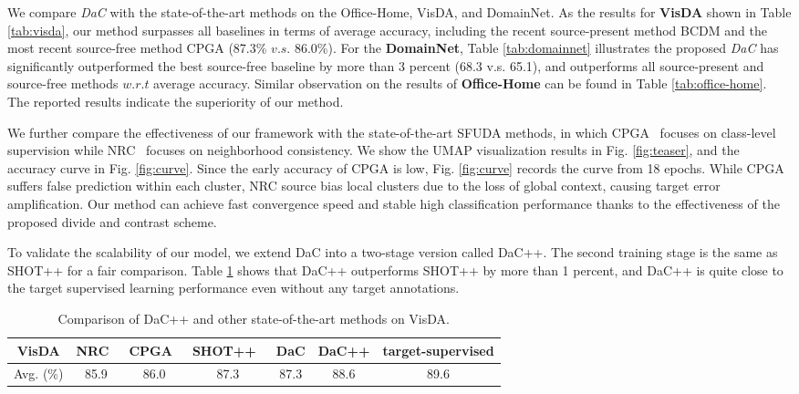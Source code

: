 \documentclass{article}
\newcommand{\modelName}{DaC}
\begin{document}
We compare \textit{\modelName} with the state-of-the-art methods on the Office-Home, VisDA, and DomainNet. As the results for \textbf{VisDA} shown in Table \ref{tab:visda}, our method surpasses all baselines in terms of average accuracy, including the recent source-present method BCDM and the most recent source-free method CPGA (87.3\% $v.s.$ 86.0\%). For the \textbf{DomainNet}, Table \ref{tab:domainnet} illustrates the proposed \textit{\modelName} has significantly outperformed the best source-free baseline by more than 3 percent (68.3 v.s. 65.1), and outperforms all source-present and source-free methods $w.r.t$ average accuracy. Similar observation on the results of \textbf{Office-Home} can be found in Table \ref{tab:office-home}. The reported results indicate the superiority of our method.


We further compare the effectiveness of our framework with the state-of-the-art SFUDA methods, in which CPGA~\cite{Qiu2021ijcai} focuses on class-level supervision while NRC~\cite{nrc_nips_2021} focuses on neighborhood consistency. 
We show the UMAP visualization results in Fig. \ref{fig:teaser}, and the accuracy curve in Fig. \ref{fig:curve}. Since the early accuracy of CPGA is low, Fig. \ref{fig:curve} records the curve from 18 epochs.
While CPGA suffers false prediction within each cluster, NRC source bias local clusters due to the loss of global context, causing target error amplification.
Our method can achieve fast convergence speed and stable high classification performance thanks to the effectiveness of the proposed divide and contrast scheme.

To validate the scalability of our model, we extend DaC into a two-stage version called DaC++. The second training stage is the same as SHOT++ for a fair comparison. Table \ref{tab:scalability} shows that DaC++ outperforms SHOT++ by more than 1 percent, and DaC++ is quite close to the target supervised learning performance even without any target annotations. 
\begin{table}[!htbp]
    \vspace{-3mm}
    \centering
     \caption{Comparison of DaC++ and other state-of-the-art methods on VisDA.}\label{tab:scalability}
    \begin{tabular}{ccccccc}
					\toprule
					VisDA & NRC~\cite{nrc_nips_2021} &	CPGA~\cite{Qiu2021ijcai} & SHOT++~\cite{liang2021shot_pp} & DaC & 	DaC++ &	target-supervised   \\
					\midrule
					\multicolumn{1}{c}{Avg. (\%)} & 85.9 &	86.0 &	87.3 & 87.3 &	88.6 &	89.6\\
					\bottomrule
		\end{tabular}
    \vspace{-3mm}
\end{table}
\end{document}
